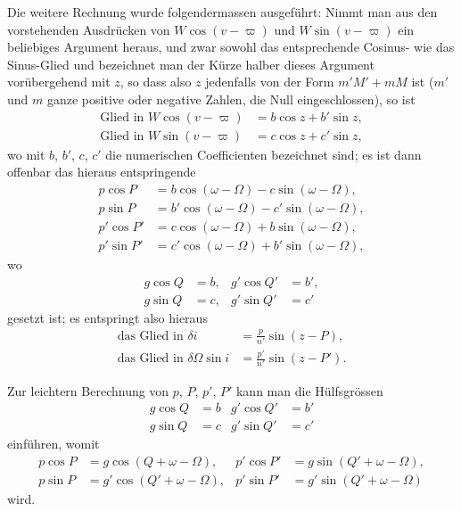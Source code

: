 \documentclass[12pt,a4paper]{article}
\begin{document}
Die weitere Rechnung wurde folgendermassen ausgeführt: Nimmt man aus den vorstehenden Ausdrücken von $W \cos(v-\varpi)$ und $W \sin(v-\varpi)$ ein beliebiges Argument heraus, und zwar sowohl das entsprechende Cosinus- wie das Sinus-Glied und bezeichnet man der Kürze halber dieses Argument vorübergehend mit $z$, so dass also $z$ jedenfalls von der Form $m'M' + mM$ ist ($m'$ und $m$ ganze positive oder negative Zahlen, die Null eingeschlossen), so ist
\begin{align*}
\text{Glied in } W \cos(v-\varpi) &= b \cos z + b' \sin z,\\
\text{Glied in } W \sin(v-\varpi) &= c \cos z + c' \sin z,
\end{align*}
wo mit $b$, $b'$, $c$, $c'$ die numerischen Coefficienten bezeichnet sind; es ist dann offenbar das hieraus entspringende
\begin{align*}
p \cos P &= b \cos(\omega - \Omega) - c \sin(\omega - \Omega),\\
p \sin P &= b' \cos(\omega - \Omega) - c' \sin(\omega - \Omega),\\
p' \cos P' &= c \cos(\omega - \Omega) + b \sin(\omega - \Omega),\\
p' \sin P' &= c' \cos(\omega - \Omega) + b' \sin(\omega - \Omega),
\end{align*}
wo
\begin{align*}
g \cos Q &= b, & g' \cos Q' &= b',\\
g \sin Q &= c, & g' \sin Q' &= c'
\end{align*}
gesetzt ist; es entspringt also hieraus
\begin{align*}
\text{das Glied in } \delta i &= \frac{p}{n'} \sin(z - P),\\
\text{das Glied in } \delta \Omega \sin i &= \frac{p'}{n'} \sin(z - P').
\end{align*}

Zur leichtern Berechnung von $p$, $P$, $p'$, $P'$ kann man die Hülfsgrössen
\begin{align*}
g \cos Q &= b & g' \cos Q' &= b'\\
g \sin Q &= c & g' \sin Q' &= c'
\end{align*}
einführen, womit
\begin{align*}
p \cos P &= g \cos(Q + \omega - \Omega), & p' \cos P' &= g \sin(Q' + \omega - \Omega),\\
p \sin P &= g' \cos(Q' + \omega - \Omega), & p' \sin P' &= g' \sin(Q' + \omega - \Omega)
\end{align*}
wird.
\end{document}
